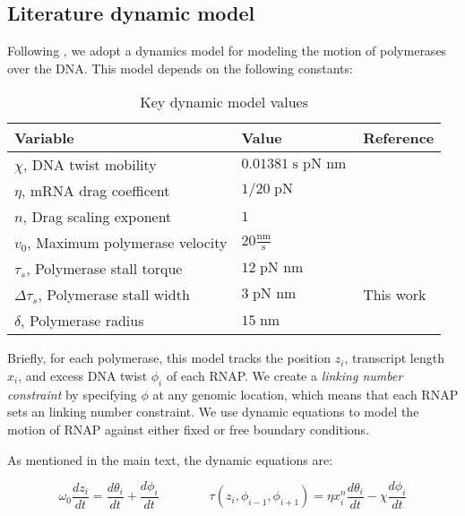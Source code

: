 \documentclass[11pt]{article} %
\newcommand{\units}[2]{\frac{\text{#1}}{\text{#2}}\,}
\newcommand{\unit}[1]{\; \text{#1}\,}
\begin{document}
\subsection{Literature dynamic model}
Following \textcite{sevierPropertiesGeneExpression2018}, we adopt a dynamics model for modeling the motion of polymerases over the DNA. This model depends on the following constants:

\begin{table}[h]
    \centering
    \begin{tabular}{@{}lll@{}}
        \toprule
        Variable & Value & Reference \\
        \midrule
        \(\chi\), DNA twist mobility  & \(0.01381 \unit{s pN nm}\) & \parencite{sevierPropertiesGeneExpression2018} \\
        \(\eta\), mRNA drag coefficent  & \(1/20 \unit{pN}\) & \parencite{sevierPropertiesGeneExpression2018} \\
        \(n\), Drag scaling exponent  & \(1\) & \parencite{sevierPropertiesGeneExpression2018} \\
        \(v_0\), Maximum polymerase velocity  & \(20 \units{nm}{s}\) & \parencite{sevierPropertiesGeneExpression2018} \\
        \(\tau_s\), Polymerase stall torque  & \(12 \unit{pN nm}\) & \parencite{sevierPropertiesGeneExpression2018} \\
        \(\Delta \tau_s\), Polymerase stall width  & \(3 \unit{pN nm}\) & This work \\
        \(\delta\), Polymerase radius  & \(15 \unit{nm}\) & \parencite{sevierPropertiesGeneExpression2018} \\
        \bottomrule
    \end{tabular}
    \caption{Key dynamic model values}
    \label{tab:dynamic_model_constants}
\end{table}
\FloatBarrier
Briefly, for each polymerase, this model tracks the position \(z_i\), transcript length \(x_i\), and excess DNA twist \(\phi_i\) of each RNAP. We create a \emph{linking number constraint} by specifying \(\phi\) at any genomic location, which means that each RNAP sets an linking number constraint. We use dynamic equations to model the motion of RNAP against either fixed or free boundary conditions.

As mentioned in the main text, the dynamic equations are:

\begin{equation*}
    \omega_0 \frac{d z_i}{dt} = \frac{d \theta_i}{dt} + \frac{d \phi_i}{dt} \qquad \qquad \tau(z_i, \phi_{i-1}, \phi_{i+1}) = \eta x_i^n \frac{d\theta_i}{dt} - \chi \frac{d\phi_i}{dt}
\end{equation*}
\end{document}
